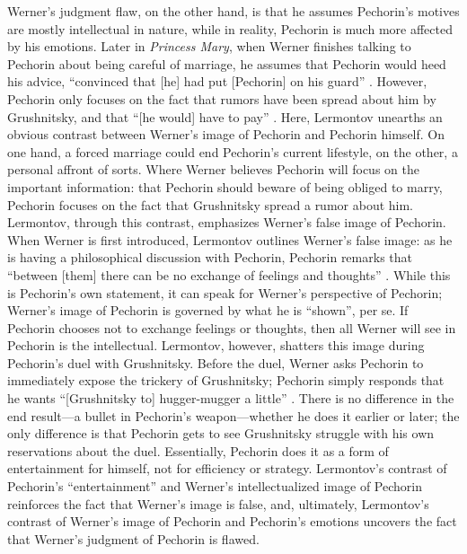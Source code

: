 \documentclass[a4paper,12pt]{article}
\newcommand{\mcite}{\mancite\cite}
\begin{document}
    Werner's judgment flaw, on the other hand, is that he assumes Pechorin's motives are mostly
    intellectual in nature, while in reality, Pechorin is much more affected by his emotions.
    Later in \textit{Princess Mary}, when Werner finishes talking to Pechorin about being careful
    of marriage, he assumes that Pechorin would heed his advice, ``convinced that [he] had put
    [Pechorin] on his guard'' \mcite[129]{book}. However, Pechorin only focuses on the fact that
    rumors have been spread about him by Grushnitsky, and that ``[he would] have to pay''
    \mcite[129]{book}. Here, Lermontov unearths an obvious contrast between Werner's image of
    Pechorin and Pechorin himself. On one hand, a forced marriage could end Pechorin's current
    lifestyle, on the other, a personal affront of sorts. Where Werner believes Pechorin will focus
    on the important information: that Pechorin should beware of being obliged to marry, Pechorin
    focuses on the fact that Grushnitsky spread a rumor about him. Lermontov, through this contrast,
    emphasizes Werner's false image of Pechorin. When Werner is first introduced, Lermontov outlines
    Werner's false image: as he is having a philosophical discussion with Pechorin, Pechorin remarks
    that ``between [them] there can be no exchange of feelings and thoughts'' \mcite[92]{book}.
    While this is Pechorin's own statement, it can speak for Werner's perspective of Pechorin;
    Werner's image of Pechorin is governed by what he is ``shown'', per se. If Pechorin chooses not
    to exchange feelings or thoughts, then all Werner will see in Pechorin is the intellectual.
    Lermontov, however, shatters this image during Pechorin's duel with Grushnitsky. Before the duel,
    Werner asks Pechorin to immediately expose the trickery of Grushnitsky; Pechorin simply responds
    that he wants ``[Grushnitsky to] hugger-mugger a little'' \mcite[150]{book}. There is no
    difference in the end result---a bullet in Pechorin's weapon---whether he does it earlier or
    later; the only difference is that Pechorin gets to see Grushnitsky struggle with his own
    reservations about the duel. Essentially, Pechorin does it as a form of entertainment for
    himself, not for efficiency or strategy. Lermontov's contrast of Pechorin's ``entertainment''
    and Werner's intellectualized image of Pechorin reinforces the fact that Werner's image is
    false, and,
    ultimately, Lermontov's contrast of Werner's image of Pechorin and Pechorin's emotions
    uncovers the fact that Werner's judgment of Pechorin is flawed.
\end{document}
